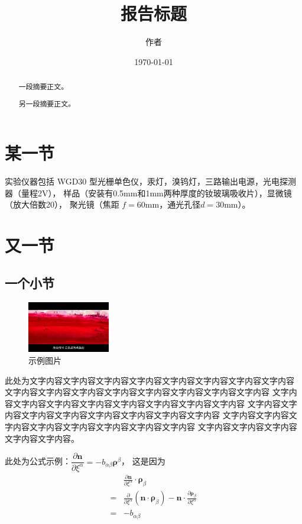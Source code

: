 \documentclass{myrep}
\title{报告标题}
\author{作者}
\affil{下北泽大学$\quad$2020114514}
\date{\today}
\begin{document}
	\maketitle

	\begin{abstract}
		一段摘要正文。

		另一段摘要正文。
	\end{abstract}

	\section{某一节}\label{sec:1}
		实验仪器包括 WGD30 型光栅单色仪，汞灯，溴钨灯，三路输出电源，光电探测器（量程2\si{\volt}），
		样品（安装有0.5\si{\milli\metre}和1\si{\milli\metre}两种厚度的钕玻璃吸收片），显微镜（放大倍数20），
		聚光镜（焦距 $f = 60\si{\milli\metre}$，通光孔径$d = 30\si{\milli\metre}$）。

	\section{又一节}
	\subsection{一个小节}
		\begin{figure}
			\centering
			\includegraphics[width=0.32\textwidth]{sample.jpg}
			\caption{示例图片}\label{fig:1}
		\end{figure}

		此处为文字内容文字内容文字内容文字内容文字内容文字内容文字内容文字内容
		文字内容文字内容文字内容文字内容文字内容文字内容文字内容文字内容
		文字内容文字内容文字内容文字内容文字内容文字内容文字内容文字内容
		文字内容文字内容文字内容文字内容文字内容文字内容文字内容文字内容
		文字内容文字内容文字内容文字内容文字内容文字内容文字内容文字内容
		文字内容文字内容文字内容文字内容文字内容。

		此处为公式示例：$\dfrac{\partial \bm{n}}{\partial \xi^\alpha}=-b_{\alpha\beta}\bm{\rho}^\beta$，
		这是因为
		\begin{align*}
			&\frac{\partial \bm{n}}{\partial \xi^\alpha}\cdot\bm{\rho}_\beta\\
			=&\frac{\partial}{\partial \xi^\alpha}(\bm{n}\cdot\bm{\rho}_\beta) - \bm{n}\cdot\frac{\partial \bm{\rho}_\beta}{\partial \xi^\alpha}\\
			=&-b_{\alpha\beta}
		\end{align*}
		
\end{document}
